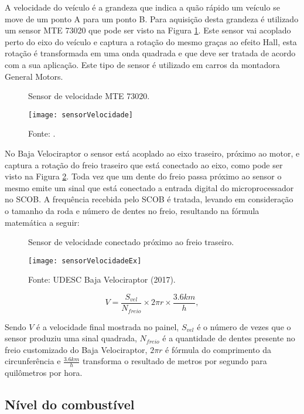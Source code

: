 A velocidade do veículo é a grandeza que indica a quão rápido um veículo se move de um ponto A para um ponto B. Para aquisição desta grandeza é utilizado um sensor MTE 73020 que pode ser visto na Figura \ref{fig:sensorVelocidade}. Este sensor vai acoplado perto do eixo do veículo e captura a rotação do mesmo graças ao efeito Hall, esta rotação é transformada em uma onda quadrada \cite{MTEsensorVelocidade} e que deve ser tratada de acordo com a sua aplicação. Este tipo de sensor é utilizado em carros da montadora General Motors.  

\begin{figure}[!htb]
	\centering
		\caption{Sensor de velocidade MTE 73020.}
		\texttt{[image: sensorVelocidade]} 
		\caption*{Fonte: \cite{MTEsensorVelocidade}.}
		\label{fig:sensorVelocidade}
\end{figure} 

No Baja Velociraptor o sensor está acoplado ao eixo traseiro, próximo ao motor, e captura a rotação do freio traseiro que está conectado ao eixo, como pode ser visto na Figura \ref{fig:sensorVelocidadeEx}. Toda vez que um dente do freio passa próximo ao sensor o mesmo emite um sinal que está conectado a entrada digital do microprocessador no SCOB. A frequência recebida pelo SCOB é tratada, levando em consideração o tamanho da roda e número de dentes no freio, resultando na fórmula matemática a seguir:

\begin{figure}[!htb]
	\centering
		\caption{Sensor de velocidade conectado próximo ao freio traseiro.}
		\texttt{[image: sensorVelocidadeEx]} 
		\caption*{Fonte: UDESC Baja Velociraptor (2017).}
		\label{fig:sensorVelocidadeEx}
\end{figure} 

	$$V = \frac{S_{vel}}{N_{freio}} \times 2 \pi r  \times \frac{3.6km}{h},$$  

Sendo $V$ é a velocidade final mostrada no painel, $S_{vel}$ é o número de vezes que o sensor produziu uma sinal quadrada, $N_{freio}$ é a quantidade de dentes presente no freio customizado do Baja Velociraptor, $2 \pi r$ é fórmula do comprimento da circunferência e $\frac{3.6km}{h}$ transforma o resultado de metros por segundo para quilômetros por hora.

\subsection{Nível do combustível}
\label{subsec:combustivel}

